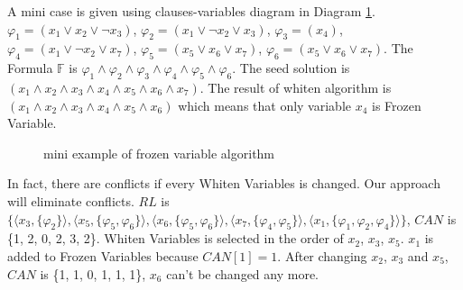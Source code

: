 \begin{example}
\end{example}
A mini case is given using clauses-variables diagram in Diagram \ref{fig:example}.
$\varphi_1=(x_1\vee x_2\vee \neg x_3)$, $\varphi_2=(x_1\vee \neg x_2\vee x_3)$, $\varphi_3=(x_4)$, $\varphi_4=(x_1\vee \neg x_2\vee x_7)$, $\varphi_5=(x_5\vee x_6\vee x_7)$, $\varphi_6=(x_5\vee x_6\vee x_7)$. The Formula $\mathbb F$ is $\varphi_1 \wedge \varphi_2 \wedge \varphi_3 \wedge \varphi_4 \wedge \varphi_5 \wedge \varphi_6 $. The seed solution is $(x_1\wedge x_2\wedge x_3\wedge x_4\wedge x_5\wedge x_6\wedge x_7)$. The result of whiten algorithm is $(x_1\wedge x_2\wedge x_3\wedge x_4\wedge x_5\wedge x_6)$ which means that only variable $x_4$ is Frozen Variable.

\begin{figure}[H]
    \centering
   \caption{mini example of frozen variable algorithm}
   \label{fig:example}
\end{figure}

In fact, there are conflicts if every Whiten Variables is changed.
Our approach will eliminate conflicts. $RL$ is $\{\langle x_3, \{\varphi_2\}\rangle, \langle x_5, \{\varphi_5, \varphi_6\} \rangle, \langle x_6, \{\varphi_5, \varphi_6\}\rangle, \langle x_7, \{\varphi_4, \varphi_5\}\rangle, \langle x_1, \{\varphi_1, \varphi_2, \varphi_4\}\rangle\}$, $CAN$ is \{1, 2, 0, 2, 3, 2\}.
Whiten Variables is selected in the order of $x_2$, $x_3$, $x_5$. $x_1$ is added to Frozen Variables because $CAN[1]=1$. After changing $x_2$, $x_3$ and $x_5$, $CAN$ is \{1, 1, 0, 1, 1, 1\}, $x_6$ can't be changed any more.

